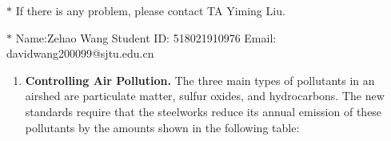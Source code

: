 \documentclass[12pt,a4paper]{article}
\theoremstyle{definition}
\begin{document}
\noindent

\noindent{}
\begin{center}
\footnotesize{\color{red}$*$ If there is any problem, please contact TA Yiming Liu. }

\footnotesize{\color{blue}$*$ Name:Zehao Wang  \quad Student ID: 518021910976 \quad Email: davidwang200099@sjtu.edu.cn}
\end{center}
\begin{enumerate}

   \item 
   \textbf{Controlling Air Pollution. }The three main types of pollutants in an airshed are particulate matter, sulfur oxides, and hydrocarbons. The new standards require that the steelworks reduce its annual emission of these pollutants by the amounts shown in the following table: 
	\begin{table}[h]
		\footnotesize
		\centering
	    \label{standards}
	    \renewcommand\arraystretch{1.1}
		\begin{tabular}{lc}
			

\end{tabular}
\end{table}
\end{enumerate}
\end{document}
